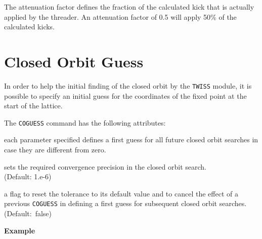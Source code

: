 The attenuation factor defines the fraction of the calculated kick that
is actually applied by the threader.  
An attenuation factor of 0.5 will apply 50\% of the calculated kicks.

\section{Closed Orbit Guess}
\label{sec:coguess}

In order to help the initial finding of the closed orbit by the
{\tt TWISS} module, it is possible to specify an initial guess for
the coordinates of the fixed point at the start of the lattice.


The {\tt COGUESS} command has the following attributes:
\begin{madlist}
   each parameter specified defines a first guess for all future closed orbit
  searches in case they are different from zero.  
  
   sets the required convergence precision in the closed
  orbit search. \\ (Default: 1.e-6)  
  
   a flag to reset the tolerance to its default value and to
  cancel the effect of a previous {\tt COGUESS} in defining a first
  guess for subsequent closed orbit searches. \\ (Default:~false) 

\end{madlist}


\textbf{Example}\\



